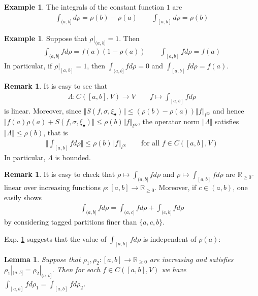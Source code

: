 \documentclass[12pt,b5paper,notitlepage]{article}
\theoremstyle{definition}
\newtheorem{eg}[df]{Example}
\newtheorem{rem}[df]{Remark}
\theoremstyle{plain}
\newtheorem{lm}[df]{Lemma}
\newcommand{\blt}{\bullet}
\newcommand{\Rbb}{\mathbb R}
\newcommand{\dps}{\displaystyle}
\numberwithin{equation}{section}
\begin{document}
\begin{eg}\label{lb71}
The integrals of the constant function $1$ are
\begin{align*}
\int_{(a,b]}d\rho=\rho(b)-\rho(a)\qquad \int_{[a,b]}d\rho=\rho(b)
\end{align*}
\end{eg}

\begin{eg}\label{lb68}
Suppose that $\rho|_{(a,b]}=1$. Then
\begin{align*}
\int_{(a,b]}fd\rho=f(a)(1-\rho(a))\qquad \int_{[a,b]}fd\rho=f(a)
\end{align*}
In particular, if $\rho|_{[a,b]}=1$, then $\dps\int_{(a,b]}fd\rho=0$ and $\dps\int_{[a,b]}fd\rho=f(a)$.
\end{eg}





\begin{rem}\label{lb65}
It is easy to see that 
\begin{align*}
\Lambda:C([a,b],V)\rightarrow V\qquad f\mapsto \int_{[a,b]}fd\rho
\end{align*}
is linear. Moreover, since $\Vert S(f,\sigma,\xi_\blt)\Vert\leq (\rho(b)-\rho(a))\Vert f\Vert_{l^\infty}$ and hence $\Vert f(a)\rho(a)+ S(f,\sigma,\xi_\blt)\Vert\leq \rho(b)\Vert f\Vert_{l^\infty}$, the operator norm $\Vert\Lambda\Vert$ satisfies $\Vert\Lambda\Vert\leq \rho(b)$, that is
\begin{align*}
\Big\Vert\int_{[a,b]}fd\rho\Big\Vert\leq \rho(b)\Vert f\Vert_{l^\infty}\qquad\text{for all }f\in C([a,b],V)
\end{align*}
In particular, $\Lambda$ is bounded.
\end{rem}

\begin{rem}\label{lb6}
It is easy to check that $\rho\mapsto\int_{(a,b]} fd\rho$ and $\rho\mapsto\int_{[a,b]} fd\rho$ are $\Rbb_{\geq0}$-linear over increasing functions $\rho:[a,b]\rightarrow\Rbb_{\geq0}$. Moreover, if $c\in(a,b)$, one easily shows
\begin{align}
\int_{(a,b]}fd\rho=\int_{(a,c]}fd\rho+\int_{(c,b]}fd\rho
\end{align}
by considering tagged partitions finer than $\{a,c,b\}$.
\end{rem}


Exp. \ref{lb68} suggests that the value of $\int_{[a,b]}fd\rho$ is independent of $\rho(a)$:

\begin{lm}\label{lb69}
Suppose that $\rho_1,\rho_2:[a,b]\rightarrow\Rbb_{\geq0}$ are increasing and satisfies $\rho_1|_{(a,b]}=\rho_2|_{(a,b]}$. Then for each $f\in C([a,b],V)$ we have $\dps\int_{[a,b]}fd\rho_1=\int_{[a,b]}fd\rho_2$.
\end{lm}
\end{document}
